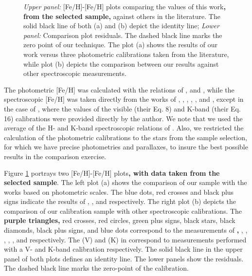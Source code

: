 \documentclass[referee]{aa}
\begin{document}
\begin{figure}[]
\begin{center}
\end{center}
\caption{\textit{Upper panel:} [Fe/H]-[Fe/H] plots comparing the values of this work\textbf{, from the selected sample,} against others in the literature. The solid black line of both (a) and (b) depict the identity line; \textit{Lower panel:} Comparison plot residuals. The dashed black line marks the zero point of our technique. The plot (a) shows the results of our work versus three photometric calibrations taken from the literature, while plot (b) depicts the comparison between our results against other spectroscopic measurements.}
\label{fig:compfeh}
\end{figure}


The photometric [Fe/H] was calculated with the relations of \citet{Bonfils-2005}, \citet{Schlaufman-2010} and \citet{Johnson-2012}, while the spectroscopic [Fe/H] was taken directly from the works of \citet{Woolf-2005}, \citet{Rojas-Ayala-2012}, \citet{Onehag-2012}, \citet{Terrien-2012}, \citet{Newton-2013}, and \citet{Mann-2013b}, except in the case of \citet{Mann-2013a}, where the values of the visible (their Eq. 8) and K-band (their Eq. 16) calibrations were provided directly by the author. We note that we used the average of the H- and K-band spectroscopic relations of \citet{Terrien-2012}. Also, we restricted the calculation of the photometric calibrations to the stars from the sample selection, for which we have precise photometries and parallaxes, to insure the best possible results in the comparison exercise.

Figure \ref{fig:compfeh} portrays two [Fe/H]-[Fe/H] plots\textbf{, with data taken from the selected sample}. The left plot (a) shows the comparison of our sample with the works based on photometric scales. The blue dots, red crosses and black plus signs indicate the results of \citet{Bonfils-2005}, \citet{Schlaufman-2010}, and \citet{Johnson-2012} respectively. The right plot (b) depicts the comparison of our calibration sample with other spectroscopic calibrations. The \textbf{purple triangles,} red crosses, red circles, green plus signs, black stars, black diamonds, black plus signs, and blue dots correspond to the measurements of \textbf{\citet[][]{Woolf-2005},} \citet{Rojas-Ayala-2012}, \citet{Onehag-2012}, \citet{Terrien-2012}, \citet{Mann-2013a}, \citet{Mann-2013b}, and \citet{Newton-2013} respectively. The (V) and (K) in \citet{Mann-2013a} correspond to measurements performed with a V- and K-band calibration respectively. The solid black line in the upper panel of both plots defines an identity line. The lower panels show the residuals. The dashed black line marks the zero-point of the calibration.
\end{document}
